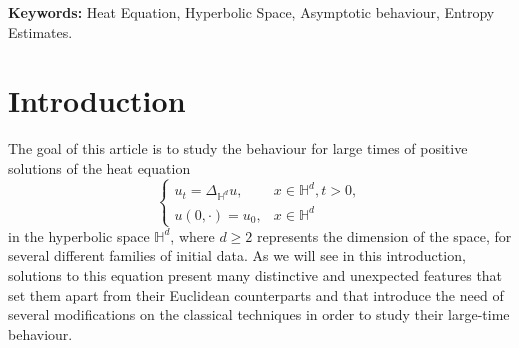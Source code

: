\documentclass[12pt,longbibliography]{article}
\title{\thetitle}
\author{\theauthor}
\date{\today}
\def\S{\mathbb{S}}
\def\H{\mathbb{H}}
\theoremstyle{definition}
\theoremstyle{remark}
\theoremstyle{example}
\begin{document}
\maketitle
	
 \begin{abstract}
   In this work we study the large-time behaviour of solutions of the Heat Equation in the hyperbolic space $\H^d$, providing precise speeds of convergence in $L^1$ and $L^\infty$ to their asymptotic profiles by means of an adaptation of entropy estimates. For $L^1$ initial conditions we are able to identify the asymptotic profile in $L^1$, which is not universal but contains a certain memory of the initial distribution of the mass of the solution. We improve thus on previous results, where speed of convergence was absent and asymptotic profiles where not known in the general case, and show a way to adapt entropy estimates employed in the study of diffusion processes to non-compact Riemannian manifolds. The main strategy to prove this is to consider  \textit{transient profiles} as minimizers of the entropy functional. These profiles are time-dependent and encompass the geometric information of the Riemannian manifold.
   
   
   
 \end{abstract}

\textbf{Keywords: } Heat Equation, Hyperbolic Space, Asymptotic behaviour, Entropy Estimates. 

\renewcommand{\thefootnote}{\fnsymbol{footnote}} 
\renewcommand{\thefootnote}{\arabic{footnote}}

\tableofcontents

\section{Introduction}
\label{sec:intro}

The goal of this article is to study the behaviour for large times of positive solutions of the heat equation
\begin{equation}\label{eq:heatEquationHyperbolic}
\begin{cases}
	u_t = \Delta_{\H^d} u, \quad &x\in \mathbb{H}^d, t>0,\\
	u(0,\cdot )=u_0, & x\in \mathbb{H}^d
\end{cases}
\end{equation}
in the hyperbolic space $\mathbb{H}^d$, where $d\geq2$ represents the dimension of the space, for several different families of initial data. As we will see in this introduction, solutions to this equation present many distinctive and unexpected features that set them apart from their Euclidean counterparts and that introduce the need of several modifications on the classical techniques in order to study their large-time behaviour.
\end{document}
